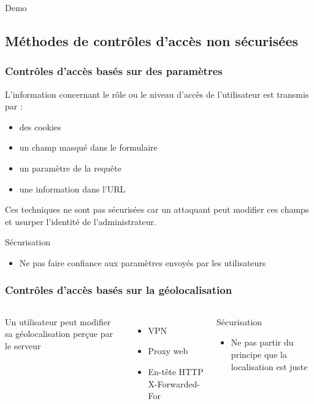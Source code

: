 \documentclass[aspectratio=169]{beamer}  %
\newcommand{\demo}{
\begin{frame}[noframenumbering]
  \begin{center}
    \Huge Demo
  \end{center}
\end{frame}}
\begin{document}
\demo

\subsection{Méthodes de contrôles d'accès non sécurisées}

\begin{frame}
  \frametitle{Contrôles d'accès basés sur des paramètres}
  L'information concernant le rôle ou le niveau d'accès de l'utilisateur est transmis par :
  \begin{itemize}
    \item des cookies
    \item un champ masqué dans le formulaire
    \item un paramètre de la requête
    \item une information dans l'URL
  \end{itemize}
  \vspace*{1em}
  Ces techniques ne sont pas sécurisées car un attaquant peut modifier ces champs et usurper l'identité de l'administrateur.
  \vspace*{1em}
  \begin{exampleblock}{Sécurisation}
    \begin{itemize}
      \item Ne pas faire confiance aux paramètres envoyés par les utilisateurs
    \end{itemize}
  \end{exampleblock}
\end{frame}


\begin{frame}
  \frametitle{Contrôles d'accès basés sur la géolocalisation}
  \begin{columns}[T]
      Un utilisateur peut modifier sa géolocalisation perçue par le serveur
      \begin{itemize}
        \item VPN
        \item Proxy web
        \item En-tête HTTP X-Forwarded-For
      \end{itemize}
      \begin{exampleblock}{Sécurisation}
        \begin{itemize}
          \item Ne pas partir du principe que la localisation est juste
        \end{itemize}
      \end{exampleblock}
  \end{columns}
\end{frame}
\end{document}
